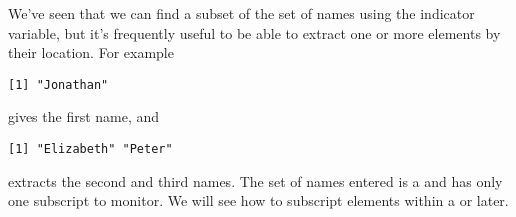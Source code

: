 We've seen that we can find a subset of the set of names using the indicator variable, but it's frequently useful to be able to extract one or more elements by their location. For example 
\begin{knitrout}
\color{fgcolor}\begin{kframe}
\begin{alltt}
\hlstd{> }\hlstd{Names[}\hlstd{]}
\end{alltt}
\begin{verbatim}
[1] "Jonathan"
\end{verbatim}
\end{kframe}
\end{knitrout}
gives the first name, and  
\begin{knitrout}
\color{fgcolor}\begin{kframe}
\begin{alltt}
\hlstd{> }\hlstd{Names[}\hlopt{:}\hlstd{]}
\end{alltt}
\begin{verbatim}
[1] "Elizabeth" "Peter"    
\end{verbatim}
\end{kframe}
\end{knitrout}
extracts the second and third names. The set of names entered is a  and has only one subscript to monitor. We will see how to subscript elements within a  or  later. 
 
